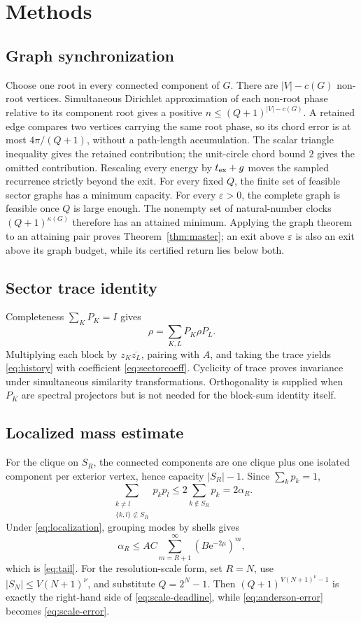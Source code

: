 \documentclass[10pt]{article}
\theoremstyle{definition}
\newcommand{\ee}{\mathrm e}
\begin{document}
\section*{Methods}

\subsection*{Graph synchronization}

Choose one root in every connected component of \(G\). There are
\(|V|-c(G)\) non-root vertices. Simultaneous Dirichlet approximation of
each non-root phase relative to its component root gives a positive
\(n\le(Q+1)^{|V|-c(G)}\). A retained edge compares two vertices carrying
the same root phase, so its chord error is at most \(4\pi/(Q+1)\), without a
path-length accumulation. The scalar triangle inequality gives the retained
contribution; the unit-circle chord bound \(2\) gives the omitted
contribution. Rescaling every energy by \(t_{\rm ex}+g\) moves the sampled
recurrence strictly beyond the exit.
For every fixed \(Q\), the finite set of feasible sector graphs has a
minimum capacity. For every \(\varepsilon>0\), the complete graph is
feasible once \(Q\) is large enough. The nonempty set of natural-number
clocks \((Q+1)^{\kappa(G)}\) therefore has an attained minimum. Applying the
graph theorem to an attaining pair proves Theorem~\ref{thm:master}; an exit
above \(\varepsilon\) is also an exit above its graph budget, while its
certified return lies below both.

\subsection*{Sector trace identity}

Completeness \(\sum_KP_K=I\) gives
\[
 \rho=\sum_{K,L}P_K\rho P_L.
\]
Multiplying each block by
\(z_K\overline{z_L}\), pairing with \(A\), and taking the trace yields
\eqref{eq:history} with coefficient \eqref{eq:sectorcoeff}. Cyclicity of
trace proves invariance under simultaneous similarity transformations.
Orthogonality is supplied when \(P_K\) are spectral projectors but is not
needed for the block-sum identity itself.

\subsection*{Localized mass estimate}

For the clique on \(S_R\), the connected components are one clique plus one
isolated component per exterior vertex, hence capacity \(|S_R|-1\). Since
\(\sum_kp_k=1\),
\[
 \sum_{\substack{k\ne l\\\{k,l\}\not\subset S_R}}p_kp_l
 \le2\sum_{k\notin S_R}p_k=2\alpha_R.
\]
Under \eqref{eq:localization}, grouping modes by shells gives
\[
 \alpha_R
 \le AC\sum_{m=R+1}^{\infty}
   (B\ee^{-2\mu})^m,
\]
which is \eqref{eq:tail}.
For the resolution-scale form, set \(R=N\), use
\(|S_N|\le V(N+1)^\nu\), and substitute \(Q=2^N-1\). Then
\((Q+1)^{V(N+1)^\nu-1}\) is exactly the right-hand side of
\eqref{eq:scale-deadline}, while \eqref{eq:anderson-error} becomes
\eqref{eq:scale-error}.
\end{document}

